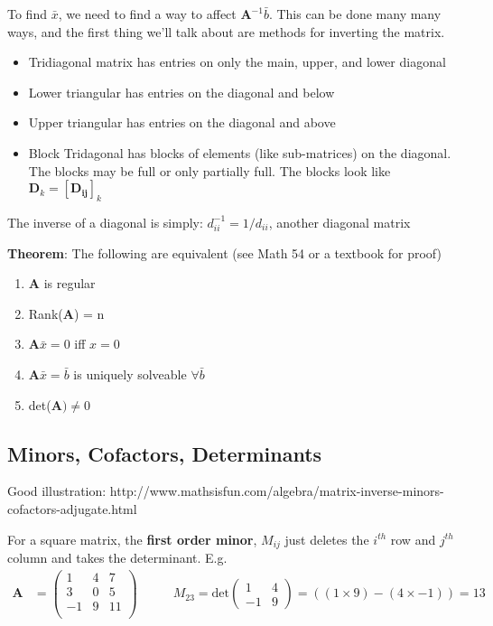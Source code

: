 \documentclass[12pt]{article}
\newcommand{\ve}[1]{\ensuremath{\mathbf{#1}}}
\begin{document}
To find $\bar{x}$, we need to find a way to affect $\ve{A}^{-1}\bar{b}$. This can be done many many ways, and the first thing we'll talk about are methods for inverting the matrix.

\begin{itemize}
\item Tridiagonal matrix has entries on only the main, upper, and lower diagonal
\item Lower triangular has entries on the diagonal and below
\item Upper triangular has entries on the diagonal and above 
\item Block Tridagonal has blocks of elements (like sub-matrices) on the diagonal. The blocks may be full or only partially full. The blocks look like $\ve{D}_k = [\ve{D_{ij}}]_k$
\end{itemize}

The inverse of a diagonal is simply: $d_{ii}^{-1} = 1/d_{ii}$, another diagonal matrix

\textbf{Theorem}: The following are equivalent (see Math 54 or a textbook for proof)
%
\begin{enumerate}
\item $\ve{A}$ is regular
\item Rank($\ve{A}$) = n
\item $\ve{A}\bar{x} = 0$ iff $x=0$
\item $\ve{A}\bar{x} = \bar{b}$ is uniquely solveable $\forall \bar{b}$
\item det($\ve{A}) \neq 0$
\end{enumerate}



\subsection{Minors, Cofactors, Determinants}

Good illustration: http://www.mathsisfun.com/algebra/matrix-inverse-minors-cofactors-adjugate.html


For a square matrix, the \textbf{first order minor}, $M_{ij}$ just deletes the $i^{th}$ row and $j^{th}$ column and takes the determinant. E.g.
%
\begin{align}
    \ve{A} &= \begin{pmatrix}
        1 & 4 & 7 \\
        3 & 0 & 5 \\
        -1 & 9 & 11 \\
    \end{pmatrix} 
    \qquad
    &M_{23} = \text{det}\begin{pmatrix}
       1 & 4 \\
       -1 & 9 
    \end{pmatrix}   
    = ((1 \times 9) - (4 \times -1)) = 13 \nonumber
\end{align} 
\end{document}

